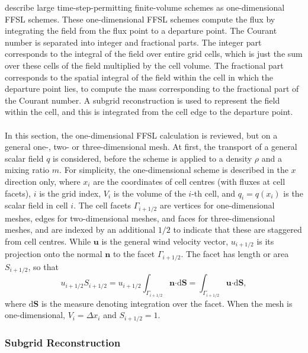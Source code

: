 \documentclass[11pt,a4paper]{article}
\begin{document}
\citet{lin1996ffsl} describe large time-step-permitting finite-volume schemes as one-dimensional FFSL schemes. These one-dimensional FFSL schemes compute the flux by integrating the field from the flux point to a departure point. The Courant number is separated into integer and fractional parts. The integer part corresponds to the integral of the field over entire grid cells, which is just the sum over these cells of the field multiplied by the cell volume. The fractional part corresponds to the spatial integral of the field within the cell in which the departure point lies, to compute the mass corresponding to the fractional part of the Courant number. A subgrid reconstruction is used to represent the field within the cell, and this is integrated from the cell edge to the departure point. \\
\\
In this section, the one-dimensional FFSL calculation is reviewed, but on a general one-, two- or three-dimensional mesh.
At first, the transport of a general scalar field $q$ is considered, before the scheme is applied to a density $\rho$ and a mixing ratio $m$.
For simplicity, the one-dimensional scheme is described in the $x$ direction only, where $x_i$ are the coordinates of cell centres (with fluxes at cell facets), $i$ is the grid index, $V_i$ is the volume of the $i$-th cell, and $q_i=q(x_i)$ is the scalar field in cell $i$.
The cell facets $\varGamma_{i+1/2}$ are vertices for one-dimensional meshes, edges for two-dimensional meshes, and faces for three-dimensional meshes, and are indexed by an additional $1/2$ to indicate that these are staggered from cell centres.
While $\bm{u}$ is the general wind velocity vector, $u_{i+1/2}$ is its projection onto the normal $\bm{n}$ to the facet $\varGamma_{i+1/2}$.
The facet has length or area $S_{i+1/2}$, so that
\begin{equation} \label{eqn:u_normal}
u_{i+1/2} S_{i+1/2} =
u_{i+1/2} \int_{\varGamma_{i+1/2}} \bm{n} \bm{\cdot} \mathrm{d}\bm{S} = \int_{\varGamma_{i+1/2}} \bm{u} \bm{\cdot} \mathrm{d}\bm{S},
\end{equation}
where $\mathrm{d}\bm{S}$ is the measure denoting integration over the facet.
When the mesh is one-dimensional, $V_i=\Delta x_i$ and $S_{i+1/2}=1$.

\subsubsection{Subgrid Reconstruction}
\end{document}
